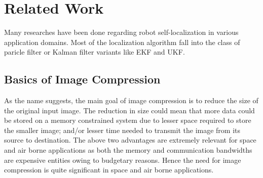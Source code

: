 \chapter{Related Work\label{cha:chapter2}}

Many researches have been done regarding robot self-localization in various application domains. 
Most of the localization algorithm fall into the class of paricle filter or Kalman filter variants like \gls{EKF} and \gls{UKF}.



\section{Basics of Image Compression\label{sec:2.1}}

As the name suggests, the main goal of image compression is to reduce the size of the original input image. The reduction in size could mean that more data could be stored on a memory constrained system due to lesser space required to store the smaller image; and/or lesser time needed to transmit the image from its source to destination. The above two advantages are extremely relevant for space and air borne applications as both the memory and communication bandwidths are expensive entities owing to budgetary reasons. Hence the need for image compression is quite significant in space and air borne applications. 

